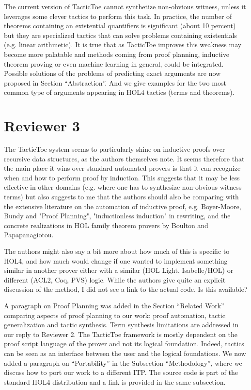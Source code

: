 \documentclass[]{scrartcl}
\begin{document}
The current version of TacticToe cannot synthetize non-obvious 
witness, unless it leverages some clever 
tactics to perform this task. In practice, the number of theorems containing 
an existential quantifiers is significant (about 10 percent) but they are 
specialized tactics that can solve problems containing existentials (e.g. 
linear arithmetic). It is true that as TacticToe improves this weakness 
may become more palatable and methods coming from proof planning, inductive 
theorem proving or even machine learning in general, could be integrated.
Possible solutions of the problems of predicting exact arguments are now 
proposed in Section ``Abstraction''. And we give examples for the two most 
common type of arguments appearing in HOL4 tactics (terms and theorems).

\section*{Reviewer 3}

\begin{leftbar}
The TacticToe system seems to particularly shine on inductive proofs over
recursive data structures, as the authors themselves note. It seems
therefore that the main place it wins over standard automated provers is
that it can recognize when and how to perform proof by induction. This
suggests that it may be less effective in other domains (e.g. where one has
to synthesize non-obvious witness terms) but also suggests to me that the
authors should also be comparing with the extensive literature on the
automation of inductive proof, e.g. Boyer-Moore, Bundy and "Proof
Planning", "inductionless induction" in rewriting, and the concrete
realizations in HOL family theorem provers by Boulton and Papapanagiotou.

The authors might also say a bit more about how much of this is specific to
HOL4, and how much would change if one wanted to implement something
similar in another prover either with a similar (HOL Light, Isabelle/HOL)
or different (ACL2, Coq, PVS) logic. While the authors give quite an
explicit discussion of the method, I did not see a link to the actual code.
Is this available?
\end{leftbar}

A paragraph on Proof Planning was added in the Section ``Related Work'' 
comparing aspects of proof planning to our work: proof automation, tactic 
generalization and tactic synthesis. Term synthesis limitations are
addressed in our reply to Reviewer 2.
The TacticToe framework is mostly dependent on the proof script language of the 
prover and not its logical foundation. Indeed, tactics can be seen as an 
interface between the user and the logical foundations. We now added a 
paragraph on ``Portability'' in the Subsection ``Methodology'', where we 
discuss how to port our work to a different ITP. The source code is part of the 
standard HOL4 distribution and a link is provided in the same subsection.
\end{document}
